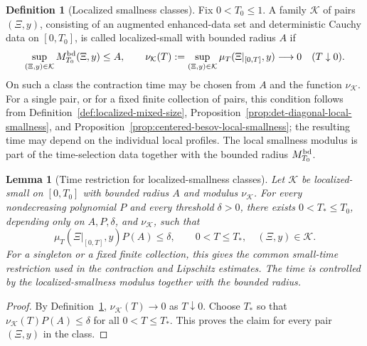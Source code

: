 \documentclass[10pt]{amsart}
\numberwithin{equation}{section}
\theoremstyle{plain}
\newtheorem{lemma}[theorem]{Lemma}
\theoremstyle{definition}
\newtheorem{definition}[theorem]{Definition}
\theoremstyle{remark}
\begin{document}
\begin{definition}[Localized smallness classes]\label{def:localized-smallness-class}
Fix $0<T_0\le1$.  A family $\mathcal K$ of pairs $(\Xi,y)$, consisting of an augmented enhanced-data set and deterministic Cauchy data on $[0,T_0]$, is called localized-small with bounded radius $A$ if
\[
        \sup_{(\Xi,y)\in\mathcal K}M_{T_0}^{\rm bd}(\Xi,y)\le A,
        \qquad
        \nu_{\mathcal K}(T):=\sup_{(\Xi,y)\in\mathcal K}\mu_T(\Xi|_{[0,T]},y)\longrightarrow0
        \quad (T\downarrow0).
\]
On such a class the contraction time may be chosen from $A$ and the function $\nu_{\mathcal K}$.  For a single pair, or for a fixed finite collection of pairs, this condition follows from Definition~\ref{def:localized-mixed-size}, Proposition~\ref{prop:det-diagonal-local-smallness}, and Proposition~\ref{prop:centered-besov-local-smallness}; the resulting time may depend on the individual local profiles.  The local smallness modulus is part of the time-selection data together with the bounded radius $M_{T_0}^{\rm bd}$.
\end{definition}

\begin{lemma}[Time restriction for localized-smallness classes]\label{lem:time-restriction-local-smallness}
Let $\mathcal K$ be localized-small on $[0,T_0]$ with bounded radius $A$ and modulus $\nu_{\mathcal K}$.  For every nondecreasing polynomial $P$ and every threshold $\delta>0$, there exists $0<T_*\le T_0$, depending only on $A,P,\delta$, and $\nu_{\mathcal K}$, such that
\[
        \mu_T(\Xi|_{[0,T]},y)P(A)\le\delta,
        \qquad 0<T\le T_*,\quad (\Xi,y)\in\mathcal K.
\]
For a singleton or a fixed finite collection, this gives the common small-time restriction used in the contraction and Lipschitz estimates.  The time is controlled by the localized-smallness modulus together with the bounded radius.
\end{lemma}

\begin{proof}
By Definition~\ref{def:localized-smallness-class}, $\nu_{\mathcal K}(T)\to0$ as $T\downarrow0$.  Choose $T_*$ so that $\nu_{\mathcal K}(T)P(A)\le\delta$ for all $0<T\le T_*$.  This proves the claim for every pair $(\Xi,y)$ in the class.
\end{proof}
\end{document}
